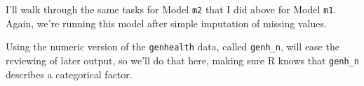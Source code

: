 \documentclass[]{book}
\newenvironment{Shaded}{\begin{snugshade}}{\end{snugshade}}
\newcommand{\KeywordTok}[1]{\textcolor[rgb]{0.13,0.29,0.53}{\textbf{#1}}}
\newcommand{\DataTypeTok}[1]{\textcolor[rgb]{0.13,0.29,0.53}{#1}}
\newcommand{\DecValTok}[1]{\textcolor[rgb]{0.00,0.00,0.81}{#1}}
\newcommand{\StringTok}[1]{\textcolor[rgb]{0.31,0.60,0.02}{#1}}
\newcommand{\OtherTok}[1]{\textcolor[rgb]{0.56,0.35,0.01}{#1}}
\newcommand{\OperatorTok}[1]{\textcolor[rgb]{0.81,0.36,0.00}{\textbf{#1}}}
\newcommand{\NormalTok}[1]{#1}
\theoremstyle{definition}
\theoremstyle{definition}
\theoremstyle{definition}
\theoremstyle{remark}
\begin{document}
I'll walk through the same tasks for Model \texttt{m2} that I did above
for Model \texttt{m1}. Again, we're running this model after simple
imputation of missing values.

Using the numeric version of the \texttt{genhealth} data, called
\texttt{genh\_n}, will ease the reviewing of later output, so we'll do
that here, making sure R knows that \texttt{genh\_n} describes a
categorical factor.

\begin{Shaded}
\end{Shaded}
\end{document}
